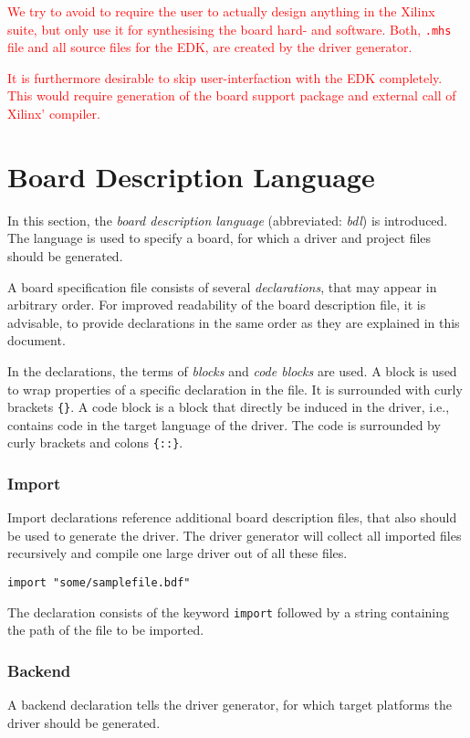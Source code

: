 \documentclass{report}
\begin{document}
 \textcolor{red}{We try to avoid to require the user to actually design anything in the Xilinx suite, but only use it for synthesising the board hard- and software. Both, \texttt{.mhs} file and all source files for the EDK, are created by the driver generator.}

\textcolor{red}{It is furthermore desirable to skip user-interfaction with the EDK completely. This would require generation of the board support package and external call of Xilinx' compiler.}

\section{Board Description Language}
In this section, the \textit{board description language} (abbreviated: \textit{bdl}) is introduced. The language is used to specify a board, for which a driver and project files should be generated. 

A board specification file consists of several \textit{declarations}, that may appear in arbitrary order. For improved readability of the board description file, it is advisable, to provide declarations in the same order as they are explained in this document.

In the declarations, the terms of \textit{blocks} and \textit{code blocks} are used. A block is used to wrap properties of a specific declaration in the file. It is surrounded with curly brackets \texttt{\{\}}.
A code block is a block that directly be induced in the driver, i.e., contains code in the target language of the driver. The code is surrounded by curly brackets and colons \texttt{\{::\}}.

\subsubsection{Import}
Import declarations reference additional board description files, that also should be used to generate the driver. The driver generator will collect all imported files recursively and compile one large driver out of all these files.

\begin{lstlisting}[language=bdl]
import "some/samplefile.bdf"
\end{lstlisting}

The declaration consists of the keyword \texttt{import} followed by a string containing the path of the file to be imported.

\subsubsection{Backend}
A backend declaration tells the driver generator, for which target platforms the driver should be generated.
\end{document}
